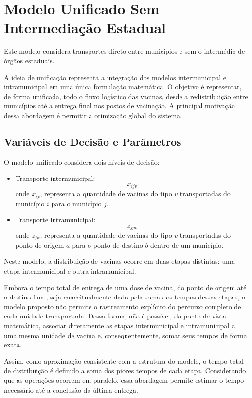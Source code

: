 \section{Modelo Unificado Sem Intermediação Estadual}

Este modelo considera transportes direto entre municípios e sem o intermédio de órgãos estaduais.

A ideia de unificação representa a integração dos modelos intermunicipal e intramunicipal em uma única formulação matemática. O objetivo é representar, de forma unificada, todo o fluxo logístico das vacinas, desde a redistribuição entre municípios até a entrega final nos postos de vacinação. A principal motivação dessa abordagem é permitir a otimização global do sistema.

\subsection{Variáveis de Decisão e Parâmetros}

O modelo unificado considera dois níveis de decisão:

\begin{itemize}
    \item Transporte intermunicipal:
    \[
    x_{ijv}
    \]
    onde $x_{ijv}$ representa a quantidade de vacinas do tipo $v$ transportadas do município $i$ para o município $j$.
    
    \item Transporte intramunicipal:
    \[
    z_{jpv}
    \]
    onde $z_{jpv}$ representa a quantidade de vacinas do tipo $v$ transportadas do ponto de origem $a$ para o ponto de destino $b$ dentro de um município.
\end{itemize}

Neste modelo, a distribuição de vacinas ocorre em duas etapas distintas: uma etapa intermunicipal e outra intramunicipal.

Embora o tempo total de entrega de uma dose de vacina, do ponto de origem até o destino final, seja conceitualmente dado pela soma dos tempos dessas etapas, o modelo proposto não permite o rastreamento explícito do percurso completo de cada unidade transportada. Dessa forma, não é possível, do ponto de vista matemático, associar diretamente as etapas intermunicipal e intramunicipal a uma mesma unidade de vacina e, consequentemente, somar seus tempos de forma exata.

Assim, como aproximação consistente com a estrutura do modelo, o tempo total de distribuição é definido a soma dos piores tempos de cada etapa. Considerando que as operações ocorrem em paralelo, essa abordagem permite estimar o tempo necessário até a conclusão da última entrega.

